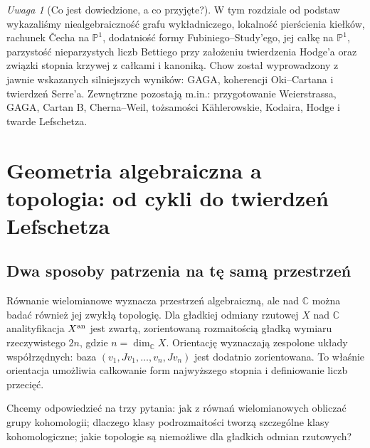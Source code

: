 \documentclass[11pt,a4paper,openany]{report}
\numberwithin{equation}{section}
\theoremstyle{plain}
\theoremstyle{definition}
\theoremstyle{remark}
\newtheorem{uwaga}[twierdzenie]{Uwaga}
\newcommand{\C}{\mathbb C}
\newcommand{\PP}{\mathbb P}
\begin{document}
\begin{uwaga}[Co jest dowiedzione, a co przyjęte?]
W tym rozdziale od podstaw wykazaliśmy niealgebraiczność
grafu wykładniczego, lokalność pierścienia kiełków,
rachunek Čecha na $\PP^1$, dodatniość formy
Fubiniego--Study'ego, jej całkę na $\PP^1$,
parzystość nieparzystych liczb Bettiego przy
założeniu twierdzenia Hodge'a oraz związki
stopnia krzywej z całkami i kanoniką.
Chow został wyprowadzony z jawnie wskazanych
silniejszych wyników: GAGA, koherencji Oki--Cartana
i twierdzeń Serre'a. Zewnętrzne pozostają m.in.:
przygotowanie Weierstrassa, GAGA, Cartan B,
Cherna--Weil, tożsamości Kählerowskie,
Kodaira, Hodge i twarde Lefschetza.
\end{uwaga}



\chapter{Geometria algebraiczna a topologia: od cykli do twierdzeń Lefschetza}
\label{ch:ga10-topologia}

\section{Dwa sposoby patrzenia na tę samą przestrzeń}
\label{sec:ga10-punkt-wyjscia}

Równanie wielomianowe wyznacza przestrzeń algebraiczną, ale nad $\C$
można badać również jej zwykłą topologię. Dla gładkiej odmiany
rzutowej $X$ nad $\C$ analityfikacja $X^{\rm an}$ jest zwartą,
zorientowaną rozmaitością gładką wymiaru rzeczywistego $2n$,
gdzie $n=\dim_{\C}X$. Orientację wyznaczają zespolone układy
współrzędnych: baza $(v_1,Jv_1,\ldots,v_n,Jv_n)$ jest dodatnio
zorientowana. To właśnie orientacja umożliwia całkowanie form
najwyższego stopnia i definiowanie liczb przecięć.

Chcemy odpowiedzieć na trzy pytania: jak z równań wielomianowych
obliczać grupy kohomologii; dlaczego klasy podrozmaitości tworzą
szczególne klasy kohomologiczne; jakie topologie są niemożliwe
dla gładkich odmian rzutowych?
\end{document}
